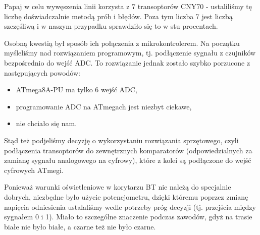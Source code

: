 Papaj w celu wywęszenia linii korzysta z 7 transoptorów CNY70 - ustaliliśmy tę liczbę doświadczalnie metodą prób i błędów. Poza tym liczba 7 jest liczbą szczęśliwą i w naszym przypadku sprawdziło się to w stu procentach.

Osobną kwestią był sposób ich połączenia z mikrokontrolerem. Na początku myśleliśmy nad rozwiązaniem programowym, tj. podłączenie sygnału z czujników bezpośrednio do wejść ADC. To rozwiązanie jednak zostało szybko porzucone z następujących powodów:
\begin{itemize}
\item ATmega8A-PU ma tylko 6 wejść ADC,
\item programowanie ADC na ATmegach jest niezbyt ciekawe,
\item nie chciało się nam.
\end{itemize}

Stąd też podjeliśmy decyzję o wykorzystaniu rozwiązania sprzętowego, czyli podłączenia transoptorów do zewnętrznych komparatorów (odpowiedzialnych za zamianę sygnału analogowego na cyfrowy), które z kolei są podłączone do wejść cyfrowych ATmegi. 

Ponieważ warunki oświetleniowe w korytarzu BT nie należą do specjalnie dobrych, niezbędne było użycie potencjometru, dzięki któremu poprzez zmianę napięcia odniesienia ustalaliśmy wedle potrzeby próg decyzji (tj. przejścia między sygnałem 0 i 1). Miało to szczególne znaczenie podczas zawodów, gdyż na trasie białe nie było białe, a czarne też nie było czarne. 
